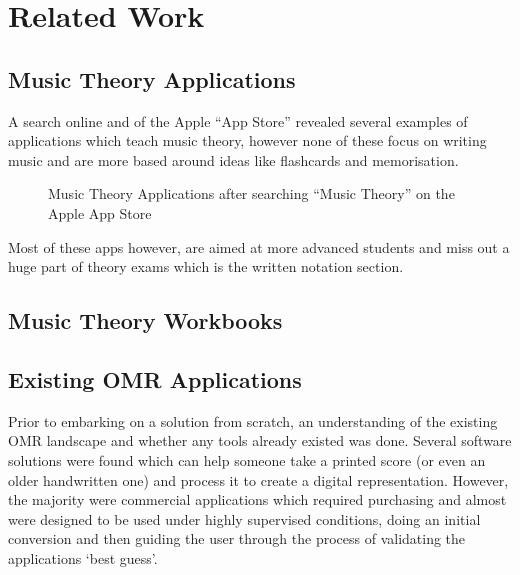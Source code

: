 \section{Related Work}

\subsection{Music Theory Applications}
A search online and of the Apple ``App Store'' revealed several examples of applications which teach music theory, however none of these focus on writing music and are more based around ideas like flashcards and memorisation.

\begin{figure}[h!]
  \centering
  \caption{Music Theory Applications after searching ``Music Theory'' on the Apple App Store}
\end{figure}

Most of these apps however, are aimed at more advanced students and miss out a huge part of theory exams which is the written notation section.

\subsection{Music Theory Workbooks}

\subsection{Existing OMR Applications}

Prior to embarking on a solution from scratch, an understanding of the existing OMR landscape and whether any tools already existed was done. Several software solutions were found which can help someone take a printed score (or even an older handwritten one) and process it to create a digital representation. However, the majority were commercial applications which required purchasing and almost were designed to be used under highly supervised conditions, doing an initial conversion and then guiding the user through the process of validating the applications `best guess'.

